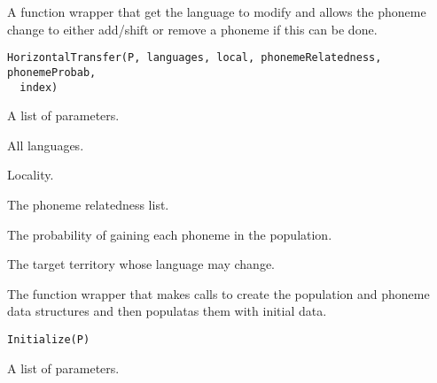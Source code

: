 \documentclass[a4paper]{book}
\begin{document}
%
\begin{Description}\relax
A function wrapper that get the language to modify and allows the phoneme change to either add/shift or remove a phoneme if this can be done.
\end{Description}
%
\begin{Usage}
\begin{verbatim}
HorizontalTransfer(P, languages, local, phonemeRelatedness, phonemeProbab,
  index)
\end{verbatim}
\end{Usage}
%
\begin{Arguments}
\begin{ldescription}
\item[\code{P}] A list of parameters.

\item[\code{languages}] All languages.

\item[\code{local}] Locality.

\item[\code{phonemeRelatedness}] The phoneme relatedness list.

\item[\code{phonemeProbab}] The probability of gaining each phoneme in the population.

\item[\code{index}] The target territory whose language may change.
\end{ldescription}
\end{Arguments}
%
\begin{Description}\relax
The function wrapper that makes calls to create the population and phoneme data structures and then populatas them with initial data.
\end{Description}
%
\begin{Usage}
\begin{verbatim}
Initialize(P)
\end{verbatim}
\end{Usage}
%
\begin{Arguments}
\begin{ldescription}
\item[\code{P}] A list of parameters.
\end{ldescription}
\end{Arguments}
\end{document}
